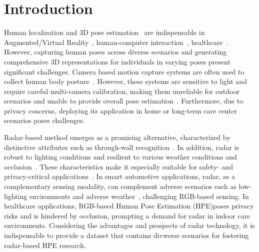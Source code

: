 \section{Introduction}
Human localization and 3D pose estimation~\cite{chai2023global,zhang2023mpm,jiang2023unihpe,liu2023posynda,jiang2024back,zhou2024efficient,jiang20242d,yang2023camerapose} are indispensable in Augmented/Virtual Reality~\cite{guzov2021human, lin2010augmented, 9417791, chai2023stablevideo}, human-computer interaction~\cite{yuan2021simpoe, hgr}, healthcare~\cite{NEURIPS2022_af9c9c6d, chen2018patient, lin2021innovative}. 
However, capturing human poses across diverse scenarios and generating comprehensive 3D representations for individuals in varying poses present significant challenges. Camera based motion capture systems are often used to collect human body posture~\cite{ionescu2013human3,wang2021deep,lin2020innovative}. However, these systems are sensitive to light and require careful multi-camera calibration, making them unreliable for outdoor scenarios and unable to provide overall pose estimation~\cite{chen2022mmbody}. 
Furthermore, due to privacy concerns, deploying its application in home or long-term care center scenarios poses challenges.

Radar-based method emerges as a promising alternative, characterized by distinctive attributes such as through-wall recognition~\cite{zhao2018through, zheng2021human}.
In addition, radar is robust to lighting conditions and resilient to various weather conditions and occlusion~\cite{adib2015rf, xie2023rpm}. 
These characteristics make it especially suitable for safety- and privacy-critical applications~\cite{ahuja2021vid2doppler,sun2022human}.
In smart automotive applications, radar, as a complementary sensing modality, can complement adverse scenarios such as low-lighting environments and adverse weather~\cite{cross_check}, challenging RGB-based sensing.
In healthcare applications, RGB-based Human Pose Estimation (HPE)poses privacy risks and is hindered by occlusion, prompting a demand for radar in indoor care environments. 
Considering the advantages and prospects of radar technology, it is indispensable to provide a dataset that contains divwerse scenarios for fostering radar-based HPE research.

